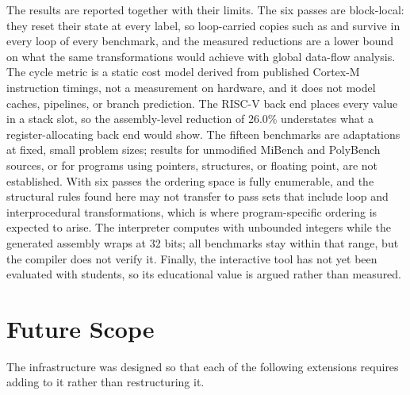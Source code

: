 The results are reported together with their limits. The six passes are block-local: they reset their state at every label, so loop-carried copies such as  and  survive in every loop of every benchmark, and the measured reductions are a lower bound on what the same transformations would achieve with global data-flow analysis. The cycle metric is a static cost model derived from published Cortex-M instruction timings, not a measurement on hardware, and it does not model caches, pipelines, or branch prediction. The RISC-V back end places every value in a stack slot, so the assembly-level reduction of 26.0\% understates what a register-allocating back end would show. The fifteen benchmarks are adaptations at fixed, small problem sizes; results for unmodified MiBench and PolyBench sources, or for programs using pointers, structures, or floating point, are not established. With six passes the ordering space is fully enumerable, and the structural rules found here may not transfer to pass sets that include loop and interprocedural transformations, which is where program-specific ordering is expected to arise. The interpreter computes with unbounded integers while the generated assembly wraps at 32 bits; all benchmarks stay within that range, but the compiler does not verify it. Finally, the interactive tool has not yet been evaluated with students, so its educational value is argued rather than measured.

\section{Future Scope}

The infrastructure was designed so that each of the following extensions requires adding to it rather than restructuring it.

